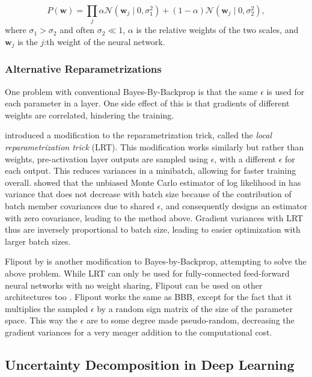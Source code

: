 	\begin{equation}
	\label{eq:gsm}
		P(\pmb{w}) = 
		\prod_{j}\alpha \mathcal{N}(\pmb{w}_j \mid 0,\sigma_1^2) + (1-\alpha)\mathcal{N}(\pmb{w}_j \mid 0,\sigma_2^2),
	\end{equation}  
	where $\sigma_1 > \sigma_2$ and often $\sigma_2 \ll 1$, $\alpha$ is the relative weights of the two scales, and $\pmb{w}_j$ is the $j$:th weight of the neural network. 
	
	\subsubsection*{Alternative Reparametrizations}

	One problem with conventional Bayes-By-Backprop is that the same $\epsilon$ is used for each parameter in a layer. One side effect of this is that gradients of different weights are correlated, hindering the training. 
	
	\citet{kingma_variational_2015} introduced a modification to the reparametrization trick, called the \textit{local reparametrization trick} (LRT). This modification works similarly but rather than weights, pre-activation layer outputs are sampled using $\epsilon$, with a different $\epsilon$ for each output. This reduces variances in a minibatch, allowing for faster training overall. \citet{kingma_variational_2015} showed that the unbiased Monte Carlo estimator of log likelihood in \citet{blundell_weight_2015} has variance that does not decrease with batch size because of the contribution of batch member covariances due to shared $\epsilon$, and consequently designs an estimator with zero covariance, leading to the method above. Gradient variances with LRT thus are inversely proportional to batch size, leading to easier optimization with larger batch sizes. 

	Flipout by \citet{wen_flipout_2018} is another modification to Bayes-by-Backprop, attempting to solve the above problem. While LRT can only be used for fully-connected feed-forward neural networks with no weight sharing, Flipout can be used on other architectures too \cite{wen_flipout_2018}. Flipout works the same as BBB, except for the fact that it multiplies the sampled $\epsilon$ by a random sign matrix of the size of the parameter space. This way the $\epsilon$ are to some degree made pseudo-random, decreasing the gradient variances for a very meager addition to the computational cost.
	


\subsection{Uncertainty Decomposition in Deep Learning} 

